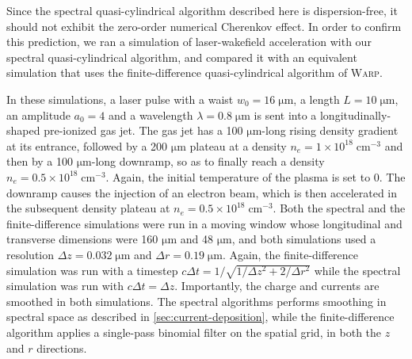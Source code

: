 \documentclass[1p,times]{elsarticle}
\begin{document}
Since the spectral quasi-cylindrical algorithm described here is
dispersion-free, it should not exhibit the zero-order numerical Cherenkov
effect. In order to confirm this prediction, we ran a simulation of
laser-wakefield acceleration with our spectral quasi-cylindrical
algorithm, and compared it with an equivalent simulation that uses 
the finite-difference quasi-cylindrical algorithm of \textsc{Warp}.

In these simulations, a laser pulse with a waist $w_0 = 16\;\mathrm{\mu m}$,
a length $L=10\;\mathrm{\mu m}$, an amplitude $a_0 = 4$ and a
wavelength $\lambda = 0.8\;\mathrm{\mu m}$
is sent into a longitudinally-shaped pre-ionized gas jet. The gas jet
has a 100 $\mathrm{\mu m}$-long rising density gradient at its
entrance, followed by a 200 $\mathrm{\mu m}$ plateau at a density $n_e = 1 \times
 10^{18}\;\mathrm{cm^{-3}}$ and then by a 100 $\mathrm{\mu m}$-long
 downramp, so as to finally reach a density $n_e = 0.5 \times
 10^{18}\;\mathrm{cm^{-3}}$.  Again, the initial temperature of
the plasma is set to 0. The downramp causes the injection of an
 electron beam, which is then accelerated in the subsequent density 
plateau at $n_e = 0.5 \times 10^{18}\;\mathrm{cm^{-3}}$. 
Both the spectral and the finite-difference simulations were run in a moving
window whose longitudinal and transverse dimensions were 160 $\mathrm{\mu
  m}$ and 48 $\mathrm{\mu m}$, and both simulations used a resolution
$\Delta z = 0.032 \; \mathrm{\mu m}$ and $\Delta r = 0.19 \; \mathrm{\mu
  m}$. Again, the finite-difference simulation was run with a timestep
$c\Delta t = 1/\sqrt{1/\Delta z^2 + 2/\Delta r^2}$ while the spectral
simulation was run with $c\Delta t = \Delta z$. Importantly, the
charge and currents are smoothed in both
simulations. The spectral algorithms performs smoothing in spectral
space as described in \cref{sec:current-deposition}, while the finite-difference
algorithm applies a single-pass binomial filter on the spatial grid,
in both the $z$ and $r$ directions.
\end{document}
